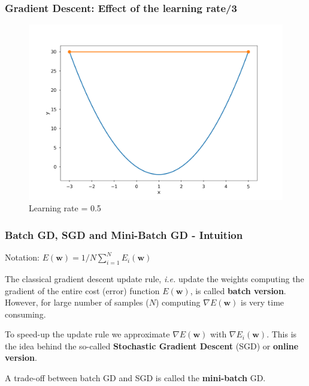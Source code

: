 \documentclass{beamer}
\begin{document}
	\begin{frame}
		\frametitle{Gradient Descent: Effect of the learning rate/3}
		\begin{figure}
			\centering
			\includegraphics[scale=0.3]{images/gradient_descent_3}
			\caption{Learning rate = 0.5}
		\end{figure}
	\end{frame}

	\begin{frame}
		\frametitle{Batch GD, SGD and Mini-Batch GD - Intuition}
		Notation: $E(\bm{w}) = 1/N \sum_{i=1}^N E_i(\bm{w})$
		
		The classical gradient descent update rule, \textit{i.e.} update the weights computing the gradient of the entire cost (error) function $E(\bm{w})$, is called \textbf{batch version}. However, for large number of samples ($N$) computing $\nabla E(\bm{w})$ is very time consuming.
		
		\vspace{5mm}
		
		To speed-up the update rule we approximate $\nabla E(\bm{w})$ with $\nabla E_i(\bm{w})$. This is the idea behind the so-called \textbf{Stochastic Gradient Descent} (SGD) or \textbf{online version}.
		
		\vspace{5mm}
		
		A trade-off between batch GD and SGD is called the \textbf{mini-batch} GD.
	\end{frame}
\end{document}
